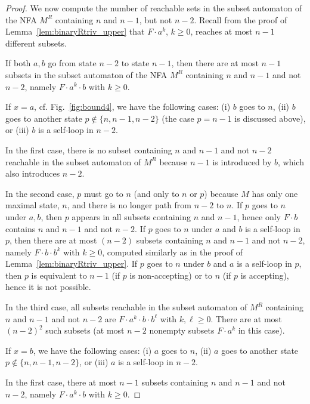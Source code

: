 \documentclass[runningheads]{llncs}
\begin{document}
\begin{proof}
    We now compute the number of reachable sets in the subset automaton of the NFA $M^R$
    containing $n$ and $n-1$, but not $n-2$.
    Recall from the proof of Lemma~\ref{lem:binaryRtriv_upper} that $F \cdot a^k$, $k\ge0$,
    reaches at most $n-1$ different subsets. 

    If both $a,b$ go from state $n-2$ to state $n-1$,
    then there are at most $n-1$ subsets in the subset automaton of the NFA $M^R$ containing $n$ and $n-1$ and not $n-2$,
    namely $F\cdot a^k \cdot b$ with $k\ge 0$.
    
    If $x=a$, cf. Fig.~\ref{fig:bound4}, we have the following cases:
    (i) $b$ goes to $n$,
    (ii) $b$ goes to another state $p\notin\{n,n-1,n-2\}$ (the case $p=n-1$ is discussed above), or
    (iii) $b$ is a self-loop in $n-2$.

    In the first case, there is no subset containing $n$ and $n-1$ and not $n-2$ reachable in the subset automaton of $M^R$ 
    because $n-1$ is introduced by $b$, which also introduces $n-2$.

    In the second case, 
    $p$ must go to $n$ (and only to $n$ or $p$) 
    because $M$ has only one maximal state, $n$, and there is no longer path from $n-2$ to $n$.
    If $p$ goes to $n$ under $a,b$,
    then $p$ appears in all subsets containing $n$ and $n-1$, 
    hence only $F\cdot b$ contains $n$ and $n-1$ and not $n-2$.
    If $p$ goes to $n$ under $a$ and $b$ is a self-loop in $p$,
    then there are at most $(n-2)$ subsets containing $n$ and $n-1$ and not $n-2$, namely $F \cdot b \cdot b^k$ with $k\ge0$,
    computed similarly as in the proof of Lemma~\ref{lem:binaryRtriv_upper}.
    If $p$ goes to $n$ under $b$ and $a$ is a self-loop in $p$, then $p$ is equivalent to $n-1$ (if $p$ is non-accepting) or to $n$ (if $p$ is accepting), hence it is not possible.


    In the third case,
    all subsets reachable in the subset automaton of $M^R$ containing $n$ and $n-1$ and not $n-2$ are $F \cdot a^k \cdot b \cdot b^\ell$ with $k,\ell\ge0$. There are at most $(n-2)^2$ such subsets (at most $n-2$ nonempty subsets $F\cdot a^k$ in this case).


    If $x=b$, we have the following cases:
    (i) $a$ goes to $n$,
    (ii) $a$ goes to another state $p\notin\{n,n-1,n-2\}$, or
    (iii) $a$ is a self-loop in $n-2$.

    In the first case, there at most $n-1$ subsets containing $n$ and $n-1$ and not $n-2$, namely $F\cdot a^k \cdot b$ with $k\ge 0$.


\end{proof}
\end{document}
